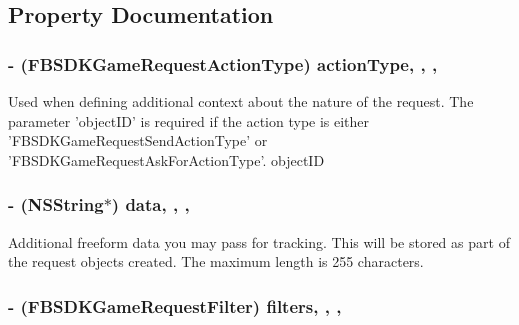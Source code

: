\subsection{Property Documentation}
\hypertarget{interface_f_b_s_d_k_game_request_content_ac80b1bf36b265614546c38983ea55aa0}{
\subsubsection[{action\-Type}]{\setlength{\rightskip}{0pt plus 5cm}-\/ (F\-B\-S\-D\-K\-Game\-Request\-Action\-Type) action\-Type\hspace{0.3cm}{\ttfamily [read]}, {\ttfamily [write]}, {\ttfamily [nonatomic]}, {\ttfamily [assign]}}}\label{interface_f_b_s_d_k_game_request_content_ac80b1bf36b265614546c38983ea55aa0}
Used when defining additional context about the nature of the request.  The parameter 'object\-I\-D' is required if the action type is either 'F\-B\-S\-D\-K\-Game\-Request\-Send\-Action\-Type' or 'F\-B\-S\-D\-K\-Game\-Request\-Ask\-For\-Action\-Type'.  object\-I\-D \hypertarget{interface_f_b_s_d_k_game_request_content_a5842159d850c0e701d7753d64e1e22be}{
\subsubsection[{data}]{\setlength{\rightskip}{0pt plus 5cm}-\/ (N\-S\-String$\ast$) data\hspace{0.3cm}{\ttfamily [read]}, {\ttfamily [write]}, {\ttfamily [nonatomic]}, {\ttfamily [copy]}}}\label{interface_f_b_s_d_k_game_request_content_a5842159d850c0e701d7753d64e1e22be}
Additional freeform data you may pass for tracking. This will be stored as part of the request objects created. The maximum length is 255 characters. \hypertarget{interface_f_b_s_d_k_game_request_content_ae1268dd62ab78042145dd25bc4ef8961}{
\subsubsection[{filters}]{\setlength{\rightskip}{0pt plus 5cm}-\/ (F\-B\-S\-D\-K\-Game\-Request\-Filter) filters\hspace{0.3cm}{\ttfamily [read]}, {\ttfamily [write]}, {\ttfamily [nonatomic]}, {\ttfamily [assign]}}}\label{interface_f_b_s_d_k_game_request_content_ae1268dd62ab78042145dd25bc4ef8961}
